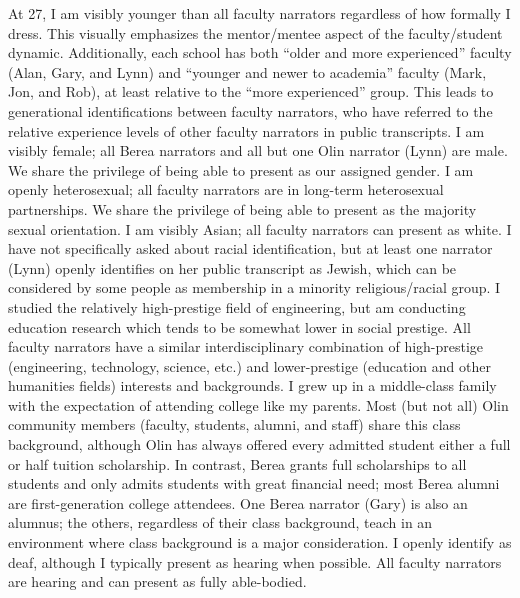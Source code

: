 \begin{enumerate}
\list At 27, I am visibly younger than all faculty narrators regardless of how formally I dress. This visually emphasizes the mentor/mentee aspect of the faculty/student dynamic. Additionally, each school has both “older and more experienced” faculty (Alan, Gary, and Lynn) and “younger and newer to academia” faculty (Mark, Jon, and Rob), at least relative to the “more experienced” group. This leads to generational identifications between faculty narrators, who have referred to the relative experience levels of other faculty narrators in public transcripts.
\list I am visibly female; all Berea narrators and all but one Olin narrator (Lynn) are male. We share the privilege of being able to present as our assigned gender.
\list I am openly heterosexual; all faculty narrators are in long-term heterosexual partnerships. We share the privilege of being able to present as the majority sexual orientation.
\list I am visibly Asian; all faculty narrators can present as white. I have not specifically asked about racial identification, but at least one narrator (Lynn) openly identifies on her public transcript as Jewish, which can be considered by some people as membership in a minority religious/racial group.
\list I studied the relatively high-prestige field of engineering, but am conducting education research which tends to be somewhat lower in social prestige. All faculty narrators have a similar interdisciplinary combination of high-prestige (engineering, technology, science, etc.) and lower-prestige (education and other humanities fields) interests and backgrounds.
\list I grew up in a middle-class family with the expectation of attending college like my parents. Most (but not all) Olin community members (faculty, students, alumni, and staff) share this class background, although Olin has always offered every admitted student either a full or half tuition scholarship. In contrast, Berea grants full scholarships to all students and only admits students with great financial need; most Berea alumni are first-generation college attendees. One Berea narrator (Gary) is also an alumnus; the others, regardless of their class background, teach in an environment where class background is a major consideration.
\list I openly identify as deaf, although I typically present as hearing when possible. All faculty narrators are hearing and can present as fully able-bodied.
\end{enumerate}

